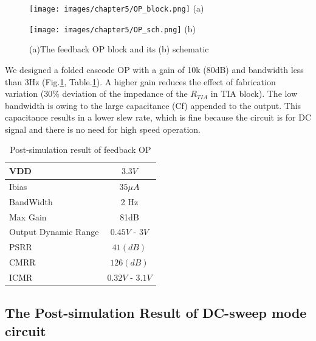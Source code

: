 {\begin{figure}[!htbp]
    \centering
    \begin{minipage}[t]{0.35\textwidth}
        \texttt{[image: images/chapter5/OP\_block.png]}
        \raggedleft
        (a)
    \end{minipage}
    \hfill
    \begin{minipage}[t]{0.6\textwidth}
        \texttt{[image: images/chapter5/OP\_sch.png]}
        \raggedleft
        (b)
    \end{minipage}
    \caption{(a)The feedback OP block and its (b) schematic}
    \label{fig:OP_sch}
\end{figure}

We designed a folded cascode OP with a gain of 10k (80dB) and bandwidth less than 3Hz (Fig.\ref{fig:OP_sch}, Table.\ref{tb:OPsim}).
A higher gain reduces the effect of fabrication variation (30\% deviation of the impedance of the $R_{TIA}$ in TIA block).
The low bandwidth is owing to the large capacitance (Cf) appended to the output.
This capacitance results in a lower slew rate, which is fine because the circuit is for DC signal and there is no need for high speed operation.

\begin{table}[!htb]
    {\fontfamily{}\fontsize{10}{14}\selectfont
    \centering
    \begin{tabular}{l|c}
        VDD & $3.3V$ \\
        \hline
        Ibias & $35\mu A$ \\
        \hline
        BandWidth & 2 Hz\\
        \hline
        Max Gain & 81dB \\
        \hline
        Output Dynamic Range & $0.45V$ - $3V$ \\
        \hline
        PSRR & $41(dB)$ \\
        \hline
        CMRR & $126(dB)$ \\
        \hline
        ICMR & $0.32V$ - $3.1V$ \\
    \end{tabular}
    \caption{Post-simulation result of feedback OP}
    \label{tb:OPsim}
    }
\end{table}

\subsection{The Post-simulation Result of DC-sweep mode circuit}

}
